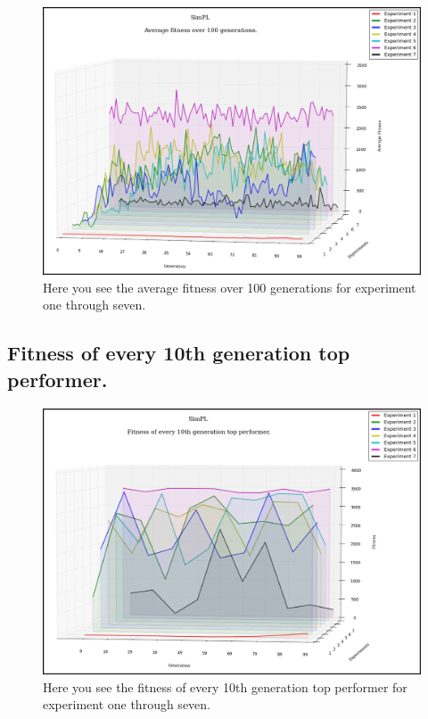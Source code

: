 \documentclass[a4paper,10pt]{article}
\begin{document}
\begin{figure}[H]  
  \centering
  \includegraphics[width=1\textwidth]{figures/all_avg_fit.png}
  \caption{Here you see the average fitness over 100 generations for experiment one through seven.}
  \label{fig:all_avg_fit}
\end{figure}

\subsection{Fitness of every 10th generation top performer.}

\begin{figure}[H]  
  \centering
  \includegraphics[width=1\textwidth]{figures/all_10_tops.png}
  \caption{Here you see the fitness of every 10th generation top performer for experiment one through seven.}
  \label{fig:all_10_tops}
\end{figure}
\end{document}
